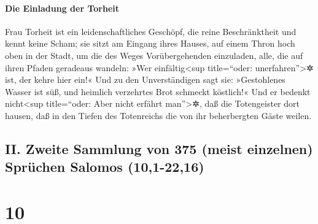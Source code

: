 \hypertarget{die-einladung-der-torheit}{%
\paragraph{Die Einladung der Torheit}\label{die-einladung-der-torheit}}

Frau Torheit ist ein leidenschaftliches Geschöpf, die
reine Beschränktheit und kennt keine Scham; sie sitzt am
Eingang ihres Hauses, auf einem Thron hoch oben in der Stadt,
um die des Weges Vorübergehenden einzuladen, alle, die
auf ihren Pfaden geradeaus wandeln: »Wer
einfältig\textless sup title=``oder: unerfahren''\textgreater✲ ist, der
kehre hier ein!« Und zu den Unverständigen sagt sie:
»Gestohlenes Wasser ist süß, und heimlich verzehrtes Brot
schmeckt köstlich!« Und er bedenkt nicht\textless sup
title=``oder: Aber nicht erfährt man''\textgreater✲, daß die
Totengeister dort hausen, daß in den Tiefen des Totenreichs die von ihr
beherbergten Gäste weilen.

\hypertarget{ii.-zweite-sammlung-von-375-meist-einzelnen-spruxfcchen-salomos-101-2216}{%
\subsection{II. Zweite Sammlung von 375 (meist einzelnen) Sprüchen
Salomos
(10,1-22,16)}\label{ii.-zweite-sammlung-von-375-meist-einzelnen-spruxfcchen-salomos-101-2216}}

\hypertarget{section-9}{%
\section{10}\label{section-9}}

